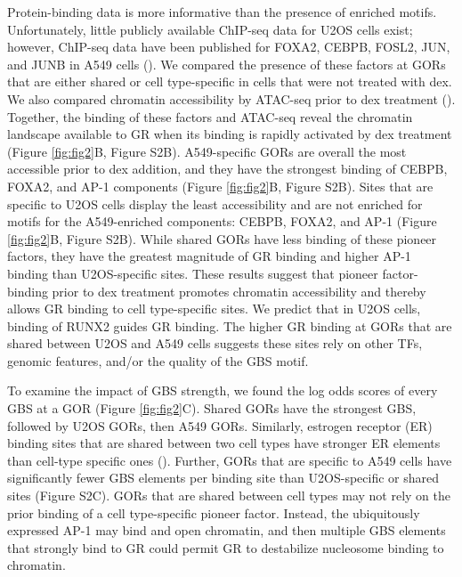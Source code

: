 \documentclass{article}
\begin{document}
{Protein-binding data is more informative than the presence of enriched motifs. Unfortunately, little publicly available ChIP-seq data for U2OS cells exist; however, ChIP-seq data have been published for FOXA2, CEBPB, FOSL2, JUN, and JUNB in A549 cells (\cite{donaghey_genetic_2018, mcdowell_glucocorticoid_2018}). We compared the presence of these factors at GORs that are either shared or cell type-specific in cells that were not treated with dex. We also compared chromatin accessibility by ATAC-seq  prior to dex treatment (\cite{encode_project_consortium_integrated_2012, davis_encyclopedia_2018, lee_different_2018}). Together, the binding of these factors and ATAC-seq reveal the chromatin landscape available to GR when its binding is rapidly activated by dex treatment (Figure \ref{fig:fig2}B, Figure S2B). A549-specific GORs are overall the most accessible prior to dex addition, and they have the strongest binding of CEBPB, FOXA2, and AP-1 components (Figure \ref{fig:fig2}B, Figure S2B). Sites that are specific to U2OS cells display the least accessibility and are not enriched for motifs for the A549-enriched components: CEBPB, FOXA2, and AP-1 (Figure \ref{fig:fig2}B, Figure S2B). While shared GORs have less binding of these pioneer factors, they have the greatest magnitude of GR binding and higher AP-1 binding than U2OS-specific sites. These results suggest that pioneer factor-binding prior to dex treatment promotes chromatin accessibility and thereby allows GR binding to cell type-specific sites. We predict that in U2OS cells, binding of RUNX2 guides GR binding. The higher GR binding at GORs that are shared between U2OS and A549 cells suggests these sites rely on other TFs, genomic features, and/or the quality of the GBS motif. 

To examine the impact of GBS strength, we found the log odds scores of every GBS at a GOR (Figure \ref{fig:fig2}C). Shared GORs have the strongest GBS, followed by U2OS GORs, then A549 GORs. Similarly, estrogen receptor (ER) binding sites that are shared between two cell types have stronger ER elements than cell-type specific ones (\cite{gertz_distinct_2013}). Further, GORs that are specific to A549 cells have significantly fewer GBS elements per binding site than U2OS-specific or shared sites (Figure S2C). GORs that are shared between cell types may not rely on the prior binding of a cell type-specific pioneer factor. Instead, the ubiquitously expressed AP-1 may bind and open chromatin, and then multiple GBS elements that strongly bind to GR could permit GR to destabilize nucleosome binding to chromatin.

}
\end{document}
